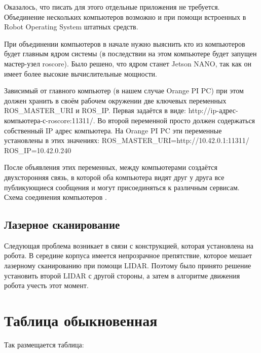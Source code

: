 Оказалось, что писать для этого отдельные приложения не требуется. Объединение нескольких компьютеров возможно и при помощи встроенных в Robot Operating System штатных средств.

При объединении компьютеров в начале нужно выяснить кто из компьютеров будет главным ядром системы (в последствии на этом компьютере будет запущен мастер-узел roscore). Было решено, что ядром станет Jetson NANO, так как он имеет более высокие вычислительные мощности. 

Зависимый от главного компьютер (в нашем случае Orange PI PC) при этом должен хранить в своём рабочем окружении две ключевых переменных ROS\_MASTER\_URI и ROS\_IP. Первая задаётся в виде: http://ip-адрес-компьютера-с-roscore:11311/. Во второй переменной просто должен содержаться собственный IP адрес компьютера. На Orange PI PC эти переменные установлены в этих значениях:
ROS\_MASTER\_URI=http://10.42.0.1:11311/
ROS\_IP=10.42.0.240  

После объявления этих переменных, между компьютерами создаётся двухсторонняя связь, в которой оба компьютера видят друг у друга все публикующиеся сообщения и могут присоединяться к различным сервисам. Схема соединения компьютеров .

\subsection{Лазерное сканирование}

Следующая проблема возникает в связи с конструкцией, которая установлена на робота. В середине корпуса имеется непрозрачное препятствие, которое мешает лазерному сканированию при помощи LIDAR. Поэтому было принято решение установить второй LIDAR с другой стороны, а затем в алгоритме движения робота учесть этот момент.


\section{Таблица обыкновенная}\label{sec:ch3/sect1}

Так размещается таблица:

